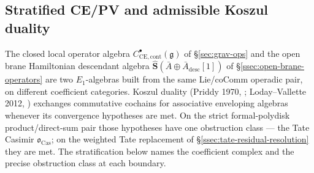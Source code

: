 \documentclass[11pt]{memoir}
\begin{document}
\subsection{Stratified CE/PV and admissible Koszul duality}\label{ssec:stratified-koszul}

The closed local operator algebra
\(C^\bullet_{\mathrm{CE},\mathrm{cont}}(\mathfrak g)\) of
\S\ref{sec:grav-ops} and the open brane Hamiltonian descendant
algebra \(\widehat{\mathbf S}(\bar A\oplus\bar A_{\mathrm{desc}}[1])\)
of \S\ref{ssec:open-brane-operators} are two \(E_1\)-algebras built
from the same Lie/coComm operadic pair, on different coefficient
categories.  Koszul duality
(Priddy 1970, \cite{priddy}; Loday--Vallette 2012,
\cite{loday-vallette}) exchanges commutative cochains for associative
enveloping algebras whenever its convergence hypotheses are met.  On
the strict formal-polydisk product/direct-sum pair those hypotheses have
one obstruction class --- the Tate Casimir
\(\mathfrak o_{\mathrm{Cas}}\); on the weighted Tate replacement of
\S\ref{ssec:tate-residual-resolution} they are met.  The stratification
below names the coefficient complex and the precise obstruction class
at each boundary.
\end{document}
